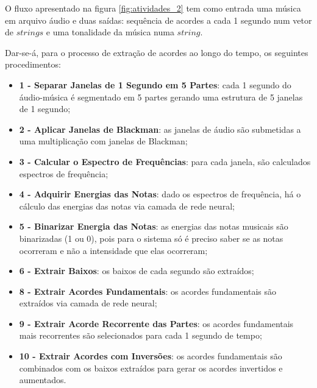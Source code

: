 O fluxo apresentado na figura \ref{fig:atividades_2} tem como entrada uma música em arquivo áudio e duas saídas: sequência de acordes a cada 1 segundo num vetor de $strings$ e uma tonalidade da música numa $string$.

Dar-se-á, para o processo de extração de acordes ao longo do tempo, os seguintes procedimentos:
\begin{itemize}
	\item \textbf{1 - Separar Janelas de 1 Segundo em 5 Partes}: cada 1 segundo do áudio-música é segmentado em 5 partes gerando uma estrutura de 5 janelas de 1 segundo;
	\item \textbf{2 - Aplicar Janelas de Blackman}: as janelas de áudio são submetidas a uma multiplicação com janelas de Blackman;
	\item \textbf{3 - Calcular o Espectro de Frequências}: para cada janela, são calculados espectros de frequência;
	\item \textbf{4 - Adquirir Energias das Notas}: dado os espectros de frequência, há o cálculo das energias das notas via camada de rede neural;
	\item \textbf{5 - Binarizar Energia das Notas}: as energias das notas musicais são binarizadas (1 ou 0), pois para o sistema só é preciso saber se as notas ocorreram e não a intensidade que elas ocorreram;
	\item \textbf{6 - Extrair Baixos}: os baixos de cada segundo são extraídos;
	\item \textbf{8 - Extrair Acordes Fundamentais}: os acordes fundamentais são extraídos via camada de rede neural;
	\item \textbf{9 - Extrair Acorde Recorrente das Partes}: os acordes fundamentais mais recorrentes são selecionados para cada 1 segundo de tempo;
	\item \textbf{10 - Extrair Acordes com Inversões}: os acordes fundamentais são combinados com os baixos extraídos para gerar os acordes invertidos e aumentados.
\end{itemize}

